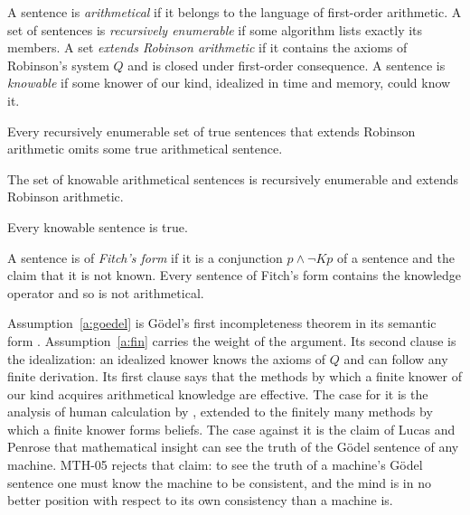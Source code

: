 \documentclass{situationist-preprint}
\begin{document}
\begin{definition}\label{d:basic}
A sentence is \emph{arithmetical} if it belongs to the language of first-order arithmetic. A set of sentences is \emph{recursively enumerable} if some algorithm lists exactly its members. A set \emph{extends Robinson arithmetic} if it contains the axioms of Robinson's system $Q$ and is closed under first-order consequence. A sentence is \emph{knowable} if some knower of our kind, idealized in time and memory, could know it.
\end{definition}

\begin{assumption}[Incompleteness]\label{a:goedel}
Every recursively enumerable set of true sentences that extends Robinson arithmetic omits some true arithmetical sentence.
\end{assumption}

\begin{assumption}\label{a:fin}
The set of knowable arithmetical sentences is recursively enumerable and extends Robinson arithmetic.
\end{assumption}

\begin{assumption}[Factivity]\label{a:fact}
Every knowable sentence is true.
\end{assumption}

\begin{definition}\label{d:fitch}
A sentence is of \emph{Fitch's form} if it is a conjunction $p \wedge \neg Kp$ of a sentence and the claim that it is not known. Every sentence of Fitch's form contains the knowledge operator and so is not arithmetical.
\end{definition}

Assumption~\ref{a:goedel} is Gödel's first incompleteness theorem in its semantic form \citep{Goedel1931}. Assumption~\ref{a:fin} carries the weight of the argument. Its second clause is the idealization: an idealized knower knows the axioms of $Q$ and can follow any finite derivation. Its first clause says that the methods by which a finite knower of our kind acquires arithmetical knowledge are effective. The case for it is the analysis of human calculation by \citet{Turing1936}, extended to the finitely many methods by which a finite knower forms beliefs. The case against it is the claim of Lucas and Penrose that mathematical insight can see the truth of the Gödel sentence of any machine. MTH-05 rejects that claim: to see the truth of a machine's Gödel sentence one must know the machine to be consistent, and the mind is in no better position with respect to its own consistency than a machine is.
\end{document}
